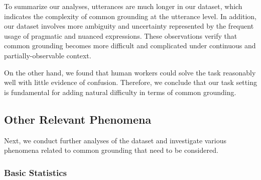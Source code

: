 \begin{table}[t!]
\centering {}
\caption{\label{03_tab:nuances}
Average occurrences of degree modifiers per 100 utterances (estimated based on keywords).
}
\end{table}

To summarize our analyses, utterances are much longer in our dataset, which indicates the complexity of common grounding at the utterance level. In addition, our dataset involves more ambiguity and uncertainty represented by the frequent usage of pragmatic and nuanced expressions. These observations verify that common grounding becomes more difficult and complicated under continuous and partially-observable context.

On the other hand, we found that human workers could solve the task reasonably well with little evidence of confusion. Therefore, we conclude that our task setting is fundamental for adding natural difficulty in terms of common grounding.

\subsection{Other Relevant Phenomena}

Next, we conduct further analyses of the dataset and investigate various phenomena related to common grounding that need to be considered.

\subsubsection{Basic Statistics}

